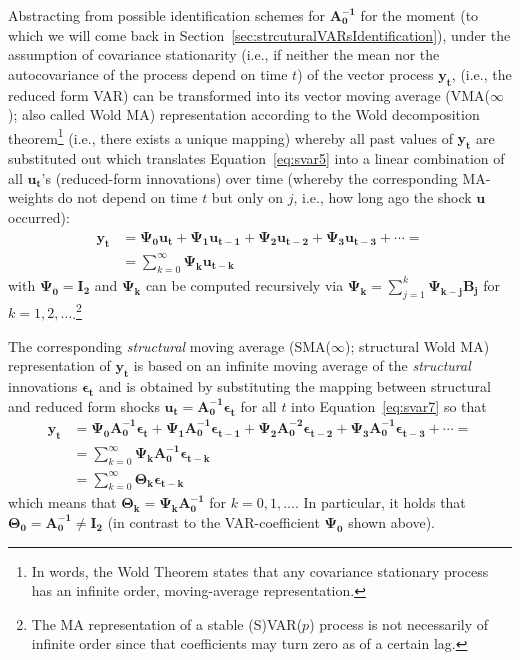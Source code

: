\documentclass[a4paper,11pt,listof=nochaptergap,oneside,pointednumbers,bibtotoc,bigheadings,liststotoc,hidelinks]{scrbook}
\theoremstyle{mysatz}
\theoremstyle{mydefinition}
\theoremstyle{mytheorem}
\theoremstyle{mybemerkung}
\newcommand{\vect}[1]{\boldsymbol{\mathbf{#1}}}
\begin{document}
Abstracting from possible identification schemes for $\vect{A_0^{-1}}$ for the moment (to which we will come back in Section~\ref{sec:strcuturalVARsIdentification}), under the assumption of covariance stationarity (i.e., if neither the mean nor the autocovariance of the process depend on time $t$) of the vector process $\vect{y_t}$, \vect{y_t} (i.e., the reduced form VAR) can be transformed into its vector moving average (VMA($\infty$); also called Wold MA) representation according to the Wold decomposition theorem\footnote{In words, the Wold Theorem states that any covariance stationary process has an infinite order, moving-average representation.} (i.e., there exists a unique mapping) whereby all past values of $\vect{y_t}$ are substituted out which translates Equation~\ref{eq:svar5} into a linear combination of all $\vect{u_t}$'s (reduced-form innovations) over time (whereby the corresponding MA-weights do not depend on time $t$ but only on $j$, i.e., how long ago the shock $\vect{u}$ occurred):
\begin{equation} \label{eq:svar7}
\begin{split}
 			\vect{y_t} & = \vect{\Psi_0}\vect{u_t} + \vect{\Psi_1}\vect{u_{t-1}} + \vect{\Psi_{2}}\vect{u_{t-2}} + \vect{\Psi_{3}}\vect{u_{t-3}} + \cdots = \\
			& = \sum\limits_{k=0}^\infty \vect{\Psi_k}\vect{u_{t-k}}
\end{split}								
\end{equation}
with $\vect{\Psi_0} =\vect{\mathbf{I_2}}$ and $\vect{\Psi_k}$ can be computed recursively via $\vect{\Psi_k} = \sum\limits_{j=1}^k \vect{\Psi_{k-j}\vect{B_j}}$ for $k=1, 2, \dots$.\footnote{The MA representation of a stable (S)VAR($p$) process is not necessarily of infinite order since that coefficients may turn zero as of a certain lag.}

The corresponding \textit{structural} moving average (SMA($\infty$); structural Wold MA) representation of $\vect{y_t}$ is based on an infinite moving average of the \textit{structural} innovations $\vect{\epsilon_t}$ and is obtained by substituting the mapping between structural and reduced form shocks $\vect{u_t} = \vect{A_0^{-1}}\vect{\epsilon_t}$ for all $t$ into Equation~\ref{eq:svar7} so that
\begin{equation} \label{eq:svar8}
\begin{split}
 			\vect{y_t} & = \vect{\Psi_0}\vect{A_0^{-1}}\vect{\epsilon_t} + \vect{\Psi_1}\vect{A_0^{-1}}\vect{\epsilon_{t-1}} + \vect{\Psi_{2}}\vect{A_0^{-2}}\vect{\epsilon_{t-2}} + \vect{\Psi_{3}}\vect{A_0^{-1}}\vect{\epsilon_{t-3}} + \cdots = \\
			& = \sum\limits_{k=0}^\infty \vect{\Psi_k}\vect{A_0^{-1}}\vect{\epsilon_{t-k}} \\
			& = \sum\limits_{k=0}^\infty \vect{\Theta_k}\vect{\epsilon_{t-k}}
\end{split}								
\end{equation}
which means that $\vect{\Theta_k} = \vect{\Psi_k}\vect{A_0^{-1}}$ for $k = 0, 1, \dots$. In particular, it holds that $\vect{\Theta_0}=\vect{A_0^{-1}} \neq \vect{I_2}$ (in contrast to the VAR-coefficient $\vect{\Psi_0}$ shown above).\\
\end{document}

